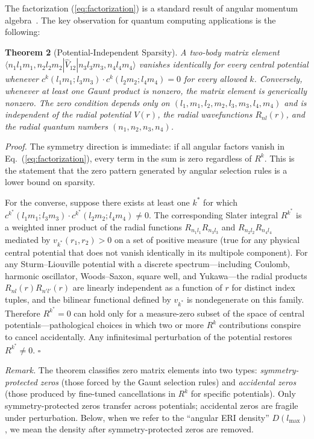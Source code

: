 \documentclass[twocolumn,pra,amsmath,amssymb,superscriptaddress]{revtex4-2}
\begin{document}
The factorization (\ref{eq:factorization}) is a standard result of
angular momentum algebra~\cite{CondonShortley1935, Slater1960,
Messiah1962}.  The key observation for quantum computing applications
is the following:

\medskip
\noindent\textbf{Theorem 2} (Potential-Independent Sparsity).\label{sec:theorem}
\textit{A two-body matrix element
$\langle n_1 l_1 m_1, n_2 l_2 m_2 | \hat{V}_{12} | n_3 l_3 m_3, n_4 l_4 m_4 \rangle$
vanishes identically for every central potential whenever
$c^k(l_1 m_1; l_3 m_3) \cdot c^k(l_2 m_2; l_4 m_4) = 0$
for every allowed $k$.  Conversely, whenever at least one Gaunt
product is nonzero, the matrix element is generically nonzero.  The
zero condition depends only on
$(l_1, m_1, l_2, m_2, l_3, m_3, l_4, m_4)$ and is independent of the
radial potential $V(r)$, the radial wavefunctions $R_{nl}(r)$, and
the radial quantum numbers $(n_1, n_2, n_3, n_4)$.}

\textit{Proof.}  The symmetry direction is immediate: if all angular
factors vanish in Eq.~(\ref{eq:factorization}), every term in the sum
is zero regardless of $R^k$.  This is the statement that the zero
pattern generated by angular selection rules is a lower bound on
sparsity.

For the converse, suppose there exists at least one $k^*$ for which
$c^{k^*}(l_1 m_1; l_3 m_3) \cdot c^{k^*}(l_2 m_2; l_4 m_4) \neq 0$.
The corresponding Slater integral $R^{k^*}$ is a weighted inner
product of the radial functions $R_{n_1 l_1} R_{n_3 l_3}$ and
$R_{n_2 l_2} R_{n_4 l_4}$ mediated by $v_{k^*}(r_1, r_2) > 0$ on a
set of positive measure (true for any physical central potential that
does not vanish identically in its multipole component).  For any
Sturm--Liouville potential with a discrete spectrum---including
Coulomb, harmonic oscillator, Woods--Saxon, square well, and
Yukawa---the radial products $R_{n l}(r) R_{n' l'}(r)$ are linearly
independent as a function of $r$ for distinct index tuples, and the
bilinear functional defined by $v_{k^*}$ is nondegenerate on this
family.  Therefore $R^{k^*} = 0$ can hold only for a measure-zero
subset of the space of central potentials---pathological choices in
which two or more $R^k$ contributions conspire to cancel
accidentally.  Any infinitesimal perturbation of the potential
restores $R^{k^*} \neq 0$.  \hfill$\square$

\textit{Remark.}  The theorem classifies zero matrix elements into
two types: \emph{symmetry-protected zeros} (those forced by the
Gaunt selection rules) and \emph{accidental zeros} (those produced
by fine-tuned cancellations in $R^k$ for specific potentials).  Only
symmetry-protected zeros transfer across potentials; accidental
zeros are fragile under perturbation.  Below, when we refer to the
``angular ERI density'' $D(l_{\max})$, we mean the density after
symmetry-protected zeros are removed.
\end{document}
